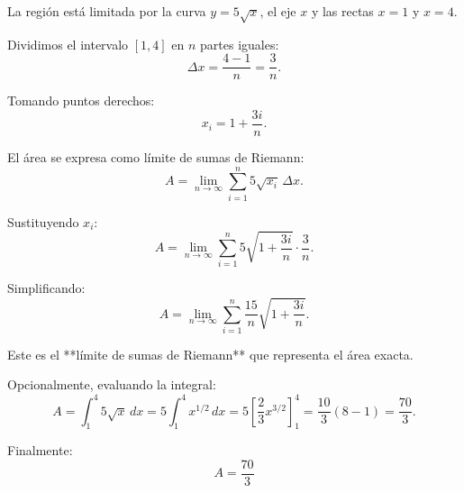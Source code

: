 
\nopagebreak

La región está limitada por la curva \(y=5\sqrt{x}\), el eje \(x\) y las rectas
\(x=1\) y \(x=4\).  

Dividimos el intervalo \([1,4]\) en \(n\) partes iguales:
\[
\Delta x = \frac{4-1}{n} = \frac{3}{n}.
\]

Tomando puntos derechos:
\[
x_i = 1 + \frac{3i}{n}.
\]

El área se expresa como límite de sumas de Riemann:
\[
A = \lim_{n\to\infty} \sum_{i=1}^{n} 5\sqrt{x_i} \, \Delta x.
\]

Sustituyendo \(x_i\):
\[
A = \lim_{n\to\infty} \sum_{i=1}^{n} 5 \sqrt{1 + \frac{3i}{n}} \cdot \frac{3}{n}.
\]

Simplificando:
\[
A = \lim_{n\to\infty} \sum_{i=1}^{n} \frac{15}{n} \sqrt{1 + \frac{3i}{n}}.
\]

Este es el **límite de sumas de Riemann** que representa el área exacta.  

Opcionalmente, evaluando la integral:
\[
A = \int_{1}^{4} 5\sqrt{x}\,dx
= 5 \int_{1}^{4} x^{1/2}\,dx
= 5 \left[ \frac{2}{3} x^{3/2} \right]_1^4
= \frac{10}{3} \left( 8 - 1 \right)
= \frac{70}{3}.
\]

Finalmente:
\[
\boxed{A = \frac{70}{3}}
\]
